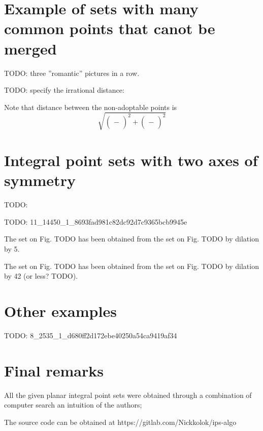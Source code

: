 \documentclass[12pt]{article}
\theoremstyle{theorem}
\theoremstyle{dfn}
\theoremstyle{remark}
\begin{document}
\section{Example of sets with many common points that canot be merged}

TODO: three ''romantic'' pictures in a row.


TODO: specify the irrational distance:

Note that distance between the non-adoptable points is
\begin{equation}
	\sqrt{\left(\frac{}{} - \frac{}{}\right)^2 + \left(\frac{}{} - \frac{}{}\right)^2}
\end{equation}

\section{Integral point sets with two axes of symmetry}

TODO:

TODO: 11_14450_1_8693fad981c82dc92d7c9365bcb9945e

The set on Fig. TODO has been obtained from the set on Fig. TODO by dilation by 5.

The set on Fig. TODO has been obtained from the set on Fig. TODO by dilation by 42 (or less? TODO).

\section{Other examples}

TODO: 8_2535_1_d680ff2d172ebe40250a54ca9419af34


\section{Final remarks}
All the given planar integral point sets were obtained through a combination of computer search an intuition of the authors;

The source code can be obtained at https://gitlab.com/Nickkolok/ips-algo

\printbibliography
\end{document}
